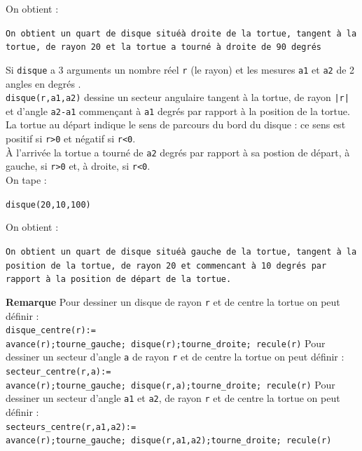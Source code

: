 \documentclass[a4paper,11pt]{book}
\begin{document}
On obtient :
\begin{center}{\tt On obtient un quart de disque situ\'e\`a droite de la tortue, tangent \`a la tortue, de rayon 20 et la tortue a tourn\'e \`a droite de 90 degr\'es}\end{center}
Si {\tt disque} a 3 arguments un nombre r\'eel {\tt r} (le rayon) et les 
mesures {\tt a1} et {\tt a2} de 2 angles en degr\'es .\\
{\tt disque(r,a1,a2)} dessine un secteur angulaire  tangent \`a la 
tortue, de rayon {\tt |r|} et d'angle {\tt a2-a1} commen\c{c}ant \`a {\tt a1} 
degr\'es par rapport \`a la position de la tortue.\\
La tortue au d\'epart indique le 
sens de parcours du bord du disque : ce sens est positif si {\tt r>0} et  
n\'egatif si {\tt r<0}.\\
\`A l'arriv\'ee la tortue a tourn\'e de {\tt a2} degr\'es par rapport \`a sa 
postion de d\'epart, \`a gauche, si {\tt r>0} et, \`a droite, si {\tt r<0}.\\
On tape :
\begin{center}{\tt disque(20,10,100)}\end{center}
On obtient :
\begin{center}{\tt On obtient un quart de disque  situ\'e\`a gauche de la tortue, tangent \`a la position de la tortue, de rayon 20 et commencant \`a 10 
degr\'es par rapport \`a la position de d\'epart de la tortue.}\end{center}
{\bf Remarque}
Pour dessiner un disque de rayon {\tt r} et de centre la tortue on peut d\'efinir :\\
{\tt disque\_centre(r):=\\
avance(r);tourne\_gauche; disque(r);tourne\_droite; recule(r)}
Pour dessiner un secteur d'angle {\tt a} de rayon {\tt r} et de centre la tortue on peut d\'efinir :\\
{\tt secteur\_centre(r,a):=\\
avance(r);tourne\_gauche; disque(r,a);tourne\_droite; recule(r)}
Pour dessiner un secteur d'angle {\tt a1} et {\tt a2}, de rayon {\tt r} et
 de centre la tortue on peut d\'efinir :\\
{\tt secteurs\_centre(r,a1,a2):=\\
avance(r);tourne\_gauche; disque(r,a1,a2);tourne\_droite; recule(r)}
\end{document}
